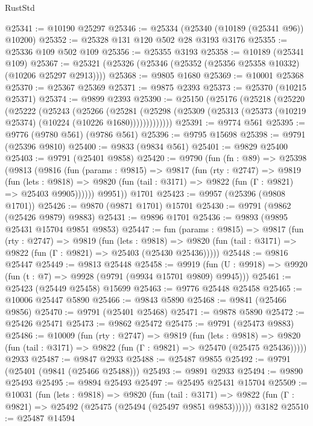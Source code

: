 \begin{lexlean}{RustStd}
\begin{coremodule}
@25341 := @10190 @25297
@25346 := @25334 (@25340 (@10189 (@25341 @96)) @10200)
@25352 := @25328 @131 @120 @502 @28 @3193 @3176
@25355 := @25336 @109 @502 @109
@25356 := @25355 @3193
@25358 := @10189 (@25341 @109)
@25367 := @25321 (@25326 (@25346 (@25352 (@25356 @25358 @10332) (@10206 @25297 @2913))))
@25368 := @9805 @1680
@25369 := @10001 @25368
@25370 := @25367 @25369
@25371 := @9875 @2393
@25373 := @25370 (@10215 @25371)
@25374 := @9899 @2393
@25390 := @25150
    (@25176
      (@25218
        (@25220
          (@25222
            (@25243
              (@25266
                (@25281
                  (@25298 (@25309 (@25313 (@25373 (@10219 @25374) (@10224 (@10226 @1680)))))))))))))
@25391 := @9774 @561
@25395 := @9776 (@9780 @561) (@9786 @561)
@25396 := @9795 @15698
@25398 := @9791 (@25396 @9810)
@25400 := @9833 (@9834 @561)
@25401 := @9829 @25400
@25403 := @9791 (@25401 @9858)
@25420 := @9790
    (fun (fn : @89) =>
    @25398
      (@9813
        (@9816
          (fun (params : @9815) =>
          @9817
            (fun (rty : @2747) =>
            @9819
              (fun (lets : @9818) =>
              @9820 (fun (tail : @3171) => @9822 (fun (Γ : @9821) => @25403 @9905))))))
        @9951))
    @1701
@25423 := @9957 (@25396 (@9808 @1701))
@25426 := @9870 (@9871 @1701) @15701
@25430 := @9791 (@9862 (@25426 @9879) @9883)
@25431 := @9896 @1701
@25436 := @9893 (@9895 @25431 @15704 @9851 @9853)
@25447 := fun (params : @9815) =>
  @9817
    (fun (rty : @2747) =>
    @9819
      (fun (lets : @9818) =>
      @9820 (fun (tail : @3171) => @9822 (fun (Γ : @9821) => @25403 (@25430 @25436)))))
@25448 := @9816 @25447
@25449 := @9813 @25448
@25458 := @9919
    (fun (U : @9918) => @9920 (fun (t : @7) => @9928 (@9791 (@9934 @15701 @9809) @9945)))
@25461 := @25423 (@25449 @25458) @15699
@25463 := @9776 @25448 @25458
@25465 := @10006 @25447 @5890
@25466 := @9843 @5890
@25468 := @9841 (@25466 @9856)
@25470 := @9791 (@25401 @25468)
@25471 := @9878 @5890
@25472 := @25426 @25471
@25473 := @9862 @25472
@25475 := @9791 (@25473 @9883)
@25486 := @10009
    (fun (rty : @2747) =>
    @9819
      (fun (lets : @9818) =>
      @9820 (fun (tail : @3171) => @9822 (fun (Γ : @9821) => @25470 (@25475 @25436)))))
    @2933
@25487 := @9847 @2933
@25488 := @25487 @9855
@25492 := @9791 (@25401 (@9841 (@25466 @25488)))
@25493 := @9891 @2933
@25494 := @9890 @25493
@25495 := @9894 @25493
@25497 := @25495 @25431 @15704
@25509 := @10031
    (fun (lets : @9818) =>
    @9820
      (fun (tail : @3171) =>
      @9822 (fun (Γ : @9821) => @25492 (@25475 (@25494 (@25497 @9851 @9853))))))
    @3182
@25510 := @25487 @14594

\end{coremodule}
\end{lexlean}
